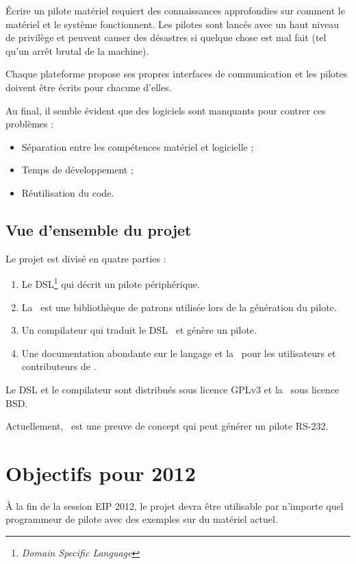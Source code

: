 \documentclass[chapterprefix=off]{rtxreport}
\begin{document}
Écrire un pilote matériel requiert des connaissances approfondies sur comment le
matériel et le système fonctionnent. Les pilotes sont lancés avec un haut niveau
de privilège et peuvent causer des désastres si quelque chose est mal fait
(tel qu'un arrêt brutal de la machine).

Chaque plateforme propose ses propres interfaces de communication et les
pilotes doivent être écrits pour chacune d'elles.

Au final, il semble évident que des logiciels sont manquants pour contrer ces
problèmes :
\begin{itemize}
\item Séparation entre les compétences matériel et logicielle ;
\item Temps de développement ;
\item Réutilisation du code.
\end{itemize}

\section{Vue d'ensemble du projet}

Le projet est divisé en quatre parties :
\begin{enumerate}
\item Le DSL\footnote{\emph{Domain Specific Language}} qui décrit un pilote
périphérique.
\item La \BL\ est une bibliothèque de patrons utilisée lors de la génération
du pilote.
\item Un compilateur qui traduit le DSL \rtx\  et génère un pilote.
\item Une documentation abondante sur le langage et la \BL\ pour les
utilisateurs et contributeurs de \rtx.
\end{enumerate}

Le DSL et le compilateur sont distribués sous licence GPLv3\cite{GPL3} et
la \BL\ sous licence BSD\cite{BSD}.

Actuellement, \rtx\  est une preuve de concept qui peut générer un pilote RS-232.

\chapter{Objectifs pour 2012}

À la fin de la session EIP 2012, le projet devra être utilisable par n'importe
quel programmeur de pilote avec des exemples sur du matériel actuel.
\end{document}
